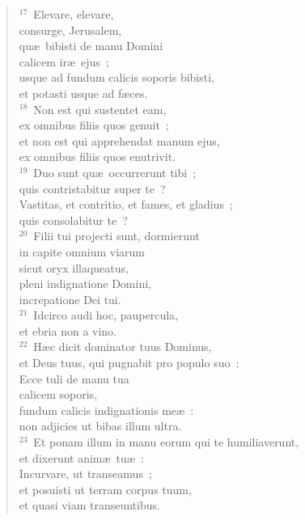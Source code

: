 \begin{flushleft}\begin{verse}${}^{17}$~Elevare, elevare,\\ consurge, Jerusalem,\\ qu\ae\ bibisti de manu Domini\\ calicem ir\ae\ ejus~;\\ usque ad fundum calicis soporis bibisti,\\ et potasti usque ad f\ae ces.\\
${}^{18}$~Non est qui sustentet eam,\\ ex omnibus filiis quos genuit~;\\ et non est qui apprehendat manum ejus,\\ ex omnibus filiis quos enutrivit.\\
${}^{19}$~Duo sunt qu\ae\ occurrerunt tibi~;\\ quis contristabitur super te~?\\ Vastitas, et contritio, et fames, et gladius~;\\ quis consolabitur te~?\\
${}^{20}$~Filii tui projecti sunt, dormierunt\\ in capite omnium viarum\\ sicut oryx illaqueatus,\\ pleni indignatione Domini,\\ increpatione Dei tui.\\
${}^{21}$~Idcirco audi hoc, paupercula,\\ et ebria non a vino.\\
${}^{22}$~H\ae c dicit dominator tuus Dominus,\\ et Deus tuus, qui pugnabit pro populo suo~:\\ Ecce tuli de manu tua\\ calicem soporis,\\ fundum calicis indignationis me\ae~:\\ non adjicies ut bibas illum ultra.\\
${}^{23}$~Et ponam illum in manu eorum qui te humiliaverunt,\\ et dixerunt anim\ae\ tu\ae~:\\ Incurvare, ut transeamus~;\\ et posuisti ut terram corpus tuum,\\ et quasi viam transeuntibus.\end{verse}\end{flushleft}


